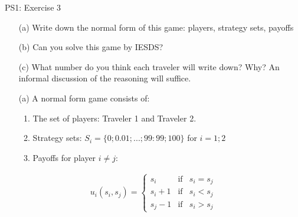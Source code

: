 \begin{frame}{PS1: Exercise 3}
\begin{multicols}{2}
  \begin{itemize}
    \item[(a)] Write down the normal form of this game: players, strategy sets, payoffs
  \item[(b)] Can you solve this game by IESDS?
  \item[(c)] What number do you think each traveler will write down? Why? An informal
  discussion of the reasoning will suffice.
  \end{itemize}
\vfill\null
\columnbreak
\begin{itemize}
  \item[(a)] A normal form game consists of:
    \begin{enumerate}
      \item The set of players: Traveler 1 and Traveler 2.
      \item Strategy sets: $S_i = \{0; 0.01; ... ; 99:99; 100\}$ for $i = 1; 2$
      \item Payoffs for player $i\neq j$:
    \end{enumerate}
\end{itemize}
\begin{align*}
  u_i(s_i,s_j)=
  \left\{ \begin{array}{ccl}
  s_i   & \mbox{if} & s_i=s_j \\
  s_i+1 & \mbox{if} & s_i<s_j \\
  s_j-1 & \mbox{if} & s_i>s_j
  \end{array}\right.
\end{align*}
\vfill\null
\end{multicols}
\end{frame}

